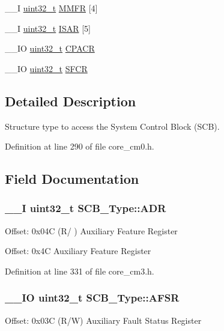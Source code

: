 \begin{DoxyCompactItemize}
\-\_\-\-\_\-\-I \hyperlink{stdint_8h_a435d1572bf3f880d55459d9805097f62}{uint32\-\_\-t} \hyperlink{struct_s_c_b___type_a40b4fec8c296cba02baec983378cbcfd}{M\-M\-F\-R} \mbox{[}4\mbox{]}
\item 
\-\_\-\-\_\-\-I \hyperlink{stdint_8h_a435d1572bf3f880d55459d9805097f62}{uint32\-\_\-t} \hyperlink{struct_s_c_b___type_a84715ecbe885efa4841d594e7409ccae}{I\-S\-A\-R} \mbox{[}5\mbox{]}
\item 
\-\_\-\-\_\-\-I\-O \hyperlink{stdint_8h_a435d1572bf3f880d55459d9805097f62}{uint32\-\_\-t} \hyperlink{struct_s_c_b___type_af460b56ce524a8e3534173f0aee78e85}{C\-P\-A\-C\-R}
\item 
\-\_\-\-\_\-\-I\-O \hyperlink{stdint_8h_a435d1572bf3f880d55459d9805097f62}{uint32\-\_\-t} \hyperlink{struct_s_c_b___type_a00ae0f2f224605dc8980a19d7624e533}{S\-F\-C\-R}
\end{DoxyCompactItemize}


\subsection{Detailed Description}
Structure type to access the System Control Block (S\-C\-B). 

Definition at line 290 of file core\-\_\-cm0.\-h.



\subsection{Field Documentation}
\hypertarget{struct_s_c_b___type_aaedf846e435ed05c68784b40d3db2bf2}{
\subsubsection[{A\-D\-R}]{\setlength{\rightskip}{0pt plus 5cm}\-\_\-\-\_\-\-I {\bf uint32\-\_\-t} S\-C\-B\-\_\-\-Type\-::\-A\-D\-R}}\label{struct_s_c_b___type_aaedf846e435ed05c68784b40d3db2bf2}
Offset\-: 0x04\-C (R/ ) Auxiliary Feature Register

Offset\-: 0x4\-C Auxiliary Feature Register 

Definition at line 331 of file core\-\_\-cm3.\-h.

\hypertarget{struct_s_c_b___type_aeb77053c84f49c261ab5b8374e8958ef}{
\subsubsection[{A\-F\-S\-R}]{\setlength{\rightskip}{0pt plus 5cm}\-\_\-\-\_\-\-I\-O {\bf uint32\-\_\-t} S\-C\-B\-\_\-\-Type\-::\-A\-F\-S\-R}}\label{struct_s_c_b___type_aeb77053c84f49c261ab5b8374e8958ef}
Offset\-: 0x03\-C (R/\-W) Auxiliary Fault Status Register

